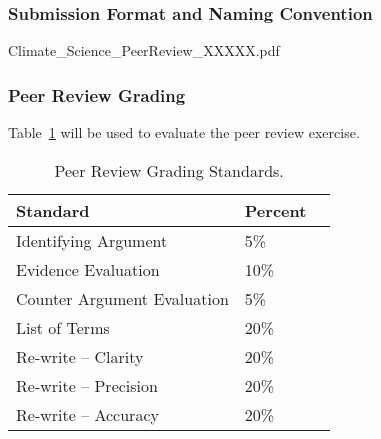 \subsubsection{Submission Format and Naming Convention}

Climate\_Science\_PeerReview\_XXXXX.pdf

\subsubsection{Peer Review Grading}

Table~\ref{tab:peerreviewgrading} will be used to evaluate the peer review exercise. 

\begin{table}[h]
\caption{Peer Review Grading Standards.}
\label{tab:peerreviewgrading}
\begin{tabular}{lll}\hline
Standard                      &   Percent   & \\ 
\hline\hline
Identifying Argument          &   5\%      & \\
Evidence Evaluation           &   10\%      & \\
Counter Argument Evaluation & 5\%    & \\
List of Terms               & 20\%    & \\
Re-write -- Clarity         & 20\%    & \\
Re-write -- Precision       & 20\%    & \\
Re-write -- Accuracy        & 20\%    & \\

\hline
\end{tabular}
\end{table}

